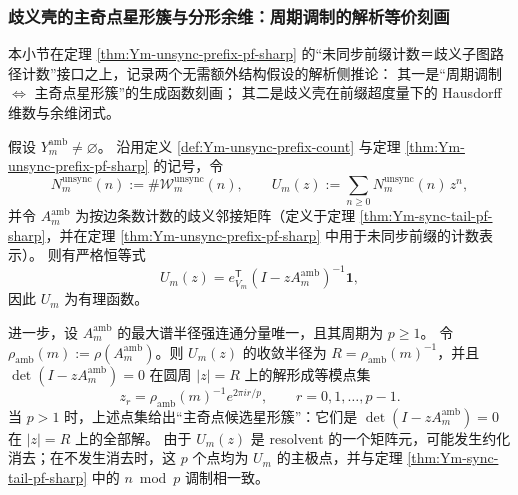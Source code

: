 
\subsubsection{歧义壳的主奇点星形簇与分形余维：周期调制的解析等价刻画}\label{subsubsec:Ym-amb-singularity-star-codimension}
本小节在定理 \ref{thm:Ym-unsync-prefix-pf-sharp} 的“未同步前缀计数＝歧义子图路径计数”接口之上，记录两个无需额外结构假设的解析侧推论：
其一是“周期调制 \(\Longleftrightarrow\) 主奇点星形簇”的生成函数刻画；
其二是歧义壳在前缀超度量下的 Hausdorff 维数与余维闭式。

\begin{theorem}\label{thm:Ym-amb-main-singularity-star}
假设 \(Y_m^{\mathrm{amb}}\neq\varnothing\)。
沿用定义 \ref{def:Ym-unsync-prefix-count} 与定理 \ref{thm:Ym-unsync-prefix-pf-sharp} 的记号，令
\[
N_m^{\mathrm{unsync}}(n):=\#\mathcal{W}_{m}^{\mathrm{unsync}}(n),
\qquad
U_m(z):=\sum_{n\ge 0}N_m^{\mathrm{unsync}}(n)\,z^n,
\]
并令 \(A_m^{\mathrm{amb}}\) 为按边条数计数的歧义邻接矩阵（定义于定理 \ref{thm:Ym-sync-tail-pf-sharp}，并在定理 \ref{thm:Ym-unsync-prefix-pf-sharp} 中用于未同步前缀的计数表示）。
则有严格恒等式
\[
U_m(z)=e_{V_m}^{\mathsf T}(I-zA_m^{\mathrm{amb}})^{-1}\mathbf 1,
\]
因此 \(U_m\) 为有理函数。
\par
进一步，设 \(A_m^{\mathrm{amb}}\) 的最大谱半径强连通分量唯一，且其周期为 \(p\ge 1\)。
令 \(\rho_{\mathrm{amb}}(m):=\rho(A_m^{\mathrm{amb}})\)。则 \(U_m(z)\) 的收敛半径为 \(R=\rho_{\mathrm{amb}}(m)^{-1}\)，并且 \(\det(I-zA_m^{\mathrm{amb}})=0\) 在圆周 \(|z|=R\) 上的解形成等模点集
\[
z_r=\rho_{\mathrm{amb}}(m)^{-1}e^{2\pi i r/p},\qquad r=0,1,\dots,p-1.
\]
当 \(p>1\) 时，上述点集给出“主奇点候选星形簇”：它们是 \(\det(I-zA_m^{\mathrm{amb}})=0\) 在 \(|z|=R\) 上的全部解。
由于 \(U_m(z)\) 是 resolvent 的一个矩阵元，可能发生约化消去；在不发生消去时，这 \(p\) 个点均为 \(U_m\) 的主极点，并与定理 \ref{thm:Ym-sync-tail-pf-sharp} 中的 \(n\bmod p\) 调制相一致。
\end{theorem}

